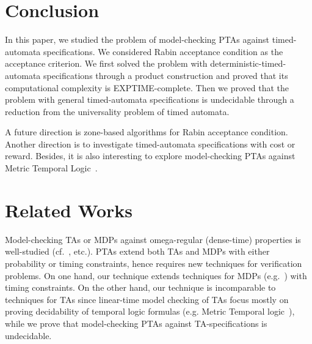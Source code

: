 \section{Conclusion}

In this paper, we studied the problem of model-checking PTAs against timed-automata specifications.
We considered Rabin acceptance condition as the acceptance criterion.
We first solved the problem with deterministic-timed-automata specifications through a product construction and proved that its computational complexity is EXPTIME-complete.
Then we proved that the problem with general timed-automata specifications is undecidable through a reduction from the universality problem of timed automata.

A future direction is zone-based algorithms for Rabin acceptance condition.
Another direction is to investigate timed-automata specifications with cost or reward.
Besides, it is also interesting to explore model-checking PTAs against Metric Temporal Logic~\cite{DBLP:journals/rts/Koymans90}.

\section{Related Works}

Model-checking TAs or MDPs against omega-regular (dense-time) properties is well-studied (cf.~\cite{DBLP:books/daglib/0020348,DBLP:conf/lics/OuaknineW05,DBLP:conf/arts/Vardi99}, etc.).
PTAs extend both TAs and MDPs with either probability or timing constraints,
hence requires new techniques for verification problems.
On one hand, our technique extends techniques for MDPs (e.g.~\cite{DBLP:conf/arts/Vardi99}) with timing constraints.
On the other hand, our technique is incomparable to techniques for TAs since linear-time model checking of TAs focus mostly on proving decidability of temporal logic formulas (e.g. Metric Temporal logic~\cite{DBLP:journals/rts/Koymans90,DBLP:journals/jacm/AlurFH96,DBLP:conf/lics/OuaknineW05}),
while we prove that model-checking PTAs against TA-specifications is undecidable.

